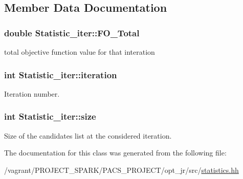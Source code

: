 \subsection{Member Data Documentation}
\hypertarget{classStatistic__iter_ac4df3aca4aa223ac64c0a32408798219}{
\subsubsection[{F\-O\-\_\-\-Total}]{\setlength{\rightskip}{0pt plus 5cm}double Statistic\-\_\-iter\-::\-F\-O\-\_\-\-Total\hspace{0.3cm}{\ttfamily [private]}}}\label{classStatistic__iter_ac4df3aca4aa223ac64c0a32408798219}


total objective function value for that interation 

\hypertarget{classStatistic__iter_a28282ee3b64c4c27509c164ccfec98a0}{
\subsubsection[{iteration}]{\setlength{\rightskip}{0pt plus 5cm}int Statistic\-\_\-iter\-::iteration\hspace{0.3cm}{\ttfamily [private]}}}\label{classStatistic__iter_a28282ee3b64c4c27509c164ccfec98a0}


Iteration number. 

\hypertarget{classStatistic__iter_a01b8c51fe357cbba9412c20fcf9d59a5}{
\subsubsection[{size}]{\setlength{\rightskip}{0pt plus 5cm}int Statistic\-\_\-iter\-::size\hspace{0.3cm}{\ttfamily [private]}}}\label{classStatistic__iter_a01b8c51fe357cbba9412c20fcf9d59a5}


Size of the candidates list at the considered iteration. 



The documentation for this class was generated from the following file\-:\begin{DoxyCompactItemize}
\item 
/vagrant/\-P\-R\-O\-J\-E\-C\-T\-\_\-\-S\-P\-A\-R\-K/\-P\-A\-C\-S\-\_\-\-P\-R\-O\-J\-E\-C\-T/opt\-\_\-jr/src/\hyperlink{statistics_8hh}{statistics.\-hh}\end{DoxyCompactItemize}
